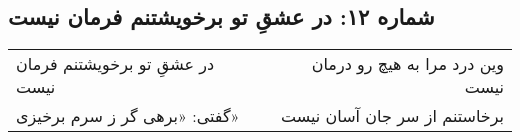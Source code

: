 \begin{center}
\section*{شماره ۱۲: در عشقِ تو برخویشتنم فرمان نیست}
\label{sec:012}
\begin{longtable}{l p{0.5cm} r}
در عشقِ تو برخویشتنم فرمان نیست
&&
وین درد مرا به هیچ رو درمان نیست
\\
گفتی: «برهی گر ز سرم برخیزی»
&&
برخاستنم از سر جان آسان نیست
\\
\end{longtable}
\end{center}
